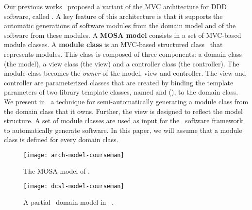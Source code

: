 Our previous works~\cite{le_tree-based_2015, le_generative_2018} proposed a variant of the MVC architecture for DDD software, called . A key feature of this architecture is that it supports the automatic generations of software modules from the domain model and of the software from these modules.
%
A \textbf{MOSA model} consists in a set of MVC-based module classes. 
A \textbf{module class} is an MVC-based structured class~\cite{omg_unified_2017} that represents modules. This class is composed of three components: a domain class (the model), a view class (the view) and a controller class (the controller). The module class becomes the \textit{owner} of the model, view and controller. The view and controller are parameterized classes that are created by binding the template parameters of two library template classes, named  and  (\resp), to the domain class.
%
We present in~\cite{le_generative_2018} a technique for semi-automatically generating a module class from the domain class that it owns. Further, the view is designed to reflect the model structure. A set of module classes are used as input for the \jdomainapp~software framework~\cite{le_jdomainapp_2017} to automatically generate software. In this paper, we will assume that a module class is defined for every domain class.


\begin{figure}[th]
	\centering
	\begin{minipage}[b]{0.4\textwidth}
		\texttt{[image: arch-model-courseman]}
		\vspace{0.1cm}\caption{The MOSA model of \courseman.}
		\label{fig:arch-model-courseman}
	\end{minipage}
	\hspace{0.5em}
	\begin{minipage}[b]{0.56\textwidth}
		\texttt{[image: dcsl-model-courseman]}
		\vspace{0.1cm}\caption{A partial \courseman~domain model in \dcsl~\cite{le_domain_2018}.}
		\label{fig:dcsl_courseman}
	\end{minipage}
\end{figure}

